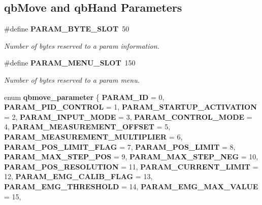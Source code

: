 \subsection*{qb\+Move and qb\+Hand Parameters}
\begin{DoxyCompactItemize}
\item 
\mbox{\label{commands_8h_ae3302107827a773be3200e459e7b24da}} 
\#define \textbf{ P\+A\+R\+A\+M\+\_\+\+B\+Y\+T\+E\+\_\+\+S\+L\+OT}~50
\begin{DoxyCompactList}\small\item\em Number of bytes reserved to a param information. \end{DoxyCompactList}\item 
\mbox{\label{commands_8h_a3bab5133f6aa363d84307b39e17b0d74}} 
\#define \textbf{ P\+A\+R\+A\+M\+\_\+\+M\+E\+N\+U\+\_\+\+S\+L\+OT}~150
\begin{DoxyCompactList}\small\item\em Number of bytes reserved to a param menu. \end{DoxyCompactList}\item 
enum \textbf{ qbmove\+\_\+parameter} \{ \newline
\textbf{ P\+A\+R\+A\+M\+\_\+\+ID} = 0, 
\textbf{ P\+A\+R\+A\+M\+\_\+\+P\+I\+D\+\_\+\+C\+O\+N\+T\+R\+OL} = 1, 
\textbf{ P\+A\+R\+A\+M\+\_\+\+S\+T\+A\+R\+T\+U\+P\+\_\+\+A\+C\+T\+I\+V\+A\+T\+I\+ON} = 2, 
\textbf{ P\+A\+R\+A\+M\+\_\+\+I\+N\+P\+U\+T\+\_\+\+M\+O\+DE} = 3, 
\newline
\textbf{ P\+A\+R\+A\+M\+\_\+\+C\+O\+N\+T\+R\+O\+L\+\_\+\+M\+O\+DE} = 4, 
\textbf{ P\+A\+R\+A\+M\+\_\+\+M\+E\+A\+S\+U\+R\+E\+M\+E\+N\+T\+\_\+\+O\+F\+F\+S\+ET} = 5, 
\textbf{ P\+A\+R\+A\+M\+\_\+\+M\+E\+A\+S\+U\+R\+E\+M\+E\+N\+T\+\_\+\+M\+U\+L\+T\+I\+P\+L\+I\+ER} = 6, 
\textbf{ P\+A\+R\+A\+M\+\_\+\+P\+O\+S\+\_\+\+L\+I\+M\+I\+T\+\_\+\+F\+L\+AG} = 7, 
\newline
\textbf{ P\+A\+R\+A\+M\+\_\+\+P\+O\+S\+\_\+\+L\+I\+M\+IT} = 8, 
\textbf{ P\+A\+R\+A\+M\+\_\+\+M\+A\+X\+\_\+\+S\+T\+E\+P\+\_\+\+P\+OS} = 9, 
\textbf{ P\+A\+R\+A\+M\+\_\+\+M\+A\+X\+\_\+\+S\+T\+E\+P\+\_\+\+N\+EG} = 10, 
\textbf{ P\+A\+R\+A\+M\+\_\+\+P\+O\+S\+\_\+\+R\+E\+S\+O\+L\+U\+T\+I\+ON} = 11, 
\newline
\textbf{ P\+A\+R\+A\+M\+\_\+\+C\+U\+R\+R\+E\+N\+T\+\_\+\+L\+I\+M\+IT} = 12, 
\textbf{ P\+A\+R\+A\+M\+\_\+\+E\+M\+G\+\_\+\+C\+A\+L\+I\+B\+\_\+\+F\+L\+AG} = 13, 
\textbf{ P\+A\+R\+A\+M\+\_\+\+E\+M\+G\+\_\+\+T\+H\+R\+E\+S\+H\+O\+LD} = 14, 
\textbf{ P\+A\+R\+A\+M\+\_\+\+E\+M\+G\+\_\+\+M\+A\+X\+\_\+\+V\+A\+L\+UE} = 15, 
\newline

\end{DoxyCompactItemize}
